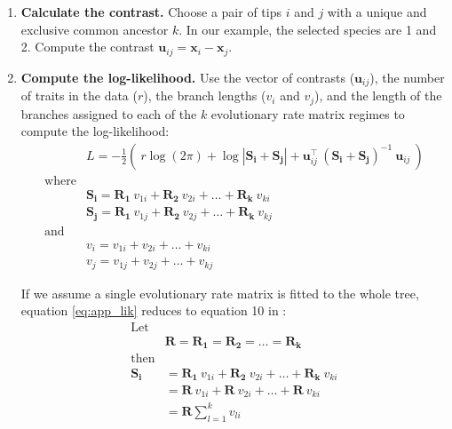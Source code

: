 \begin{enumerate}

\item \textbf{Calculate the contrast.} Choose a pair of tips $i$ and $j$ with a unique and exclusive common ancestor $k$. In our example, the selected species are 1 and 2. Compute the contrast $\mathbf{u}_{ij} = \mathbf{x}_{i} - \mathbf{x}_{j}$.

\item \textbf{Compute the log-likelihood.} Use the vector of contrasts ($\mathbf{u}_{ij}$), the number of traits in the data ($r$), the branch lengths ($v_{i}$ and $v_{j}$), and the length of the branches assigned to each of the $k$ evolutionary rate matrix regimes \citep{revell_phylogenetic_2009} to compute the log-likelihood:
\begin{equation} \label{eq:app_lik}
\begin{split}
& L = - \frac{1}{2} \left( \: r \log(2 \pi) + \log | \mathbf{S_{i}} + \mathbf{S_{j}}  | + \mathbf{u}_{ij}^\intercal \: (\mathbf{S_{i}}+\mathbf{S_{j}})^{-1} \:  \mathbf{u}_{ij} \: \right)  \\
\text{where} & \\
& \mathbf{S_{i}} = \mathbf{R_{1}} \: v_{1i} + \mathbf{R_{2}} \: v_{2i} + \ldots + \mathbf{R_{k}} \: v_{ki} \\
& \mathbf{S_{j}} = \mathbf{R_{1}} \: v_{1j} + \mathbf{R_{2}} \: v_{2j} + \ldots + \mathbf{R_{k}} \: v_{kj} \\
\text{and} & \\
& v_{i} = v_{1i} + v_{2i} + \ldots + v_{ki} \\
& v_{j} = v_{1j} + v_{2j} + \ldots + v_{kj}
\end{split}
\end{equation}

If we assume a single evolutionary rate matrix is fitted to the whole tree, equation \ref{eq:app_lik} reduces to equation 10 in \citet{freckleton_fast_2012}:
\begin{equation*}
\begin{split}
\text{Let} &\\
&\mathbf{R} = \mathbf{R_{1}} = \mathbf{R_{2}} = \ldots = \mathbf{R_{k}} \\
\text{then} &\\
\mathbf{S_{i}} &= \mathbf{R_{1}} \: v_{1i} + \mathbf{R_{2}} \: v_{2i} + \ldots + \mathbf{R_{k}} \: v_{ki} \\
&=  \mathbf{R} \: v_{1i} + \mathbf{R} \: v_{2i} + \ldots + \mathbf{R} \: v_{ki} \\
&= \mathbf{R} \sum_{l = 1}^{k} v_{li}
\end{split}
\end{equation*}


\end{enumerate}
